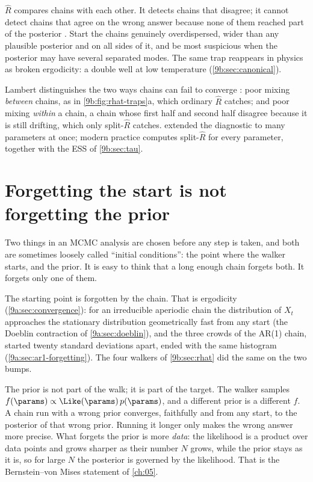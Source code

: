\begin{pitfall}
$\hat R$ compares chains with each other. It detects chains that disagree; it cannot detect
chains that agree on the wrong answer because none of them reached part of the posterior
. Start the chains genuinely overdispersed, wider than any plausible
posterior and on all sides of it, and be most suspicious when the posterior may have several
separated modes. The same trap reappears in physics as broken ergodicity: a double well at low
temperature (\cref{9b:sec:canonical}).
\end{pitfall}

Lambert distinguishes the two ways chains can fail to converge : poor
mixing \emph{between} chains, as in \cref{9b:fig:rhat-traps}a, which ordinary $\hat R$ catches;
and poor mixing \emph{within} a chain, a chain whose first half and second half disagree because
it is still drifting, which only split-$\hat R$ catches. \textcite{BrooksGelman1998} extended the
diagnostic to many parameters at once; modern practice computes split-$\hat R$ for every
parameter, together with the ESS of \cref{9b:sec:tau}.
\section{Forgetting the start is not forgetting the prior}
\label{9b:sec:start-prior}

Two things in an MCMC analysis are chosen before any step is taken, and both are sometimes loosely
called ``initial conditions'': the point where the walker starts, and the prior. It is easy to
think that a long enough chain forgets both. It forgets only one of them.

The starting point is forgotten by the chain. That is ergodicity (\cref{9a:sec:convergence}):
for an irreducible aperiodic chain the distribution of $X_t$ approaches the stationary
distribution geometrically fast from any start (the Doeblin contraction of
\cref{9a:sec:doeblin}), and the three crowds of the AR(1) chain, started twenty standard
deviations apart, ended with the same histogram (\cref{9a:sec:ar1-forgetting}). The four walkers
of \cref{9b:sec:rhat} did the same on the two bumps.

The prior is not part of the walk; it is part of the target. The walker samples
$f(\params)\propto\Like(\params)\,p(\params)$, and a different prior is a different $f$. A chain
run with a wrong prior converges, faithfully and from any start, to the posterior of that wrong
prior. Running it longer only makes the wrong answer more precise. What forgets the prior is more
\emph{data}: the likelihood is a product over data points and grows sharper as their number $N$
grows, while the prior stays as it is, so for large $N$ the posterior is governed by the
likelihood. That is the Bernstein--von Mises statement of \cref{ch:05}.

